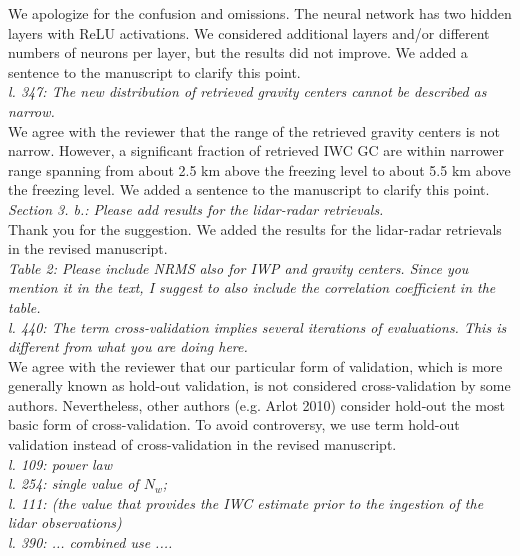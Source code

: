 \documentclass[12pt]{article}
\begin{document}
\noindent We apologize for the confusion and omissions. The neural network has two hidden layers with ReLU activations. We considered additional layers and/or different numbers of neurons per layer, but the results did not improve. We added a sentence to the manuscript to clarify this point. \\

\noindent\textit{l. 347: The new distribution of retrieved gravity centers cannot be described as narrow.}\\

\noindent We agree with the reviewer that the range of the retrieved gravity centers is not narrow. However, a significant fraction of retrieved IWC GC are within narrower range spanning from about 2.5 km above the freezing level to about 5.5 km above the freezing level. We added a sentence to the manuscript to clarify this point.\\

\noindent\textit{Section 3. b.: Please add results for the lidar-radar retrievals.}\\

\noindent Thank you for the suggestion. We added the results for the lidar-radar retrievals in the revised manuscript.\\

\noindent\textit{Table 2: Please include NRMS also for IWP and gravity centers. Since you mention it in the text, I suggest to also include the correlation coefficient in the table.}\\

\noindent\textit{l. 440: The term cross-validation implies several iterations of evaluations. This is different from what you are doing here.}\\

\noindent We agree with the reviewer that our particular form of validation, which is more generally known as hold-out validation, is not considered cross-validation by some authors. Nevertheless, other authors (e.g. Arlot 2010) consider hold-out the most basic form of cross-validation. To avoid controversy, 
we use term hold-out validation instead of cross-validation in the revised manuscript.\\


\noindent\textit{
l. 109: power law}\\
\noindent\textit{l. 254: single value of $N_w$;}\\
\noindent\textit{l. 111: (the value that provides the IWC estimate prior to the ingestion of the lidar observations)}\\
\noindent\textit{l. 390: ... combined use ....}\\
\end{document}
